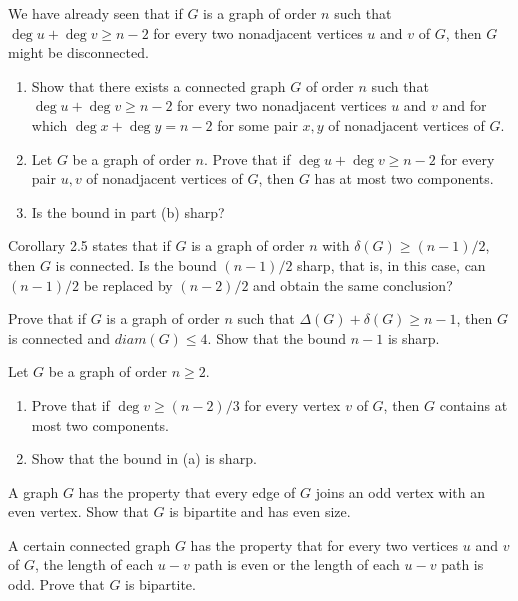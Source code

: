 \begin{exer}
We have already seen that if $G$ is a graph of order $n$ such that $\deg{}{u}+\deg{}{v} \geq n-2$ for every two nonadjacent vertices $u$ and $v$ of $G$, then $G$ might be disconnected.
\begin{enumerate}[{(a)}]
\item Show that there exists a connected graph $G$ of order $n$ such that $\deg{}{u}+\deg{}{v} \geq n-2$ for every two nonadjacent vertices $u$ and $v$ and for which $\deg{}{x}+\deg{}{y}=n-2$ for some pair $x,y$ of nonadjacent vertices of $G$.
\item Let $G$ be a graph of order $n$. Prove that if $\deg{}{u}+\deg{}{v} \geq n-2$ for every pair $u,v$ of nonadjacent vertices of $G$, then $G$ has at most two components.
\item Is the bound in part (b) sharp?
\end{enumerate}
\end{exer}

\begin{exer}
Corollary 2.5 states that if $G$ is a graph of order $n$ with $\delta(G) \geq (n-1)/2$, then $G$ is connected. Is the bound $(n-1)/2$ sharp, that is, in this case, can $(n-1)/2$ be replaced by $(n-2)/2$ and obtain the same conclusion?
\end{exer}

\begin{exer}
Prove that if $G$ is a graph of order $n$ such that $\Delta(G)+\delta(G) \geq n-1$, then $G$ is connected and $diam(G) \leq 4$. Show that the bound $n-1$ is sharp.
\end{exer}

\begin{exer}
Let $G$ be a graph of order $n \geq 2$.
\begin{enumerate}[{(a)}]
\item Prove that if $\deg{}{v} \geq (n-2)/3$ for every vertex $v$ of $G$, then $G$ contains at most two components.
\item Show that the bound in (a) is sharp.
\end{enumerate}
\end{exer}

\begin{exer}
A graph $G$ has the property that every edge of $G$ joins an odd vertex with an even vertex. Show that $G$ is bipartite and has even size.
\end{exer}

\begin{exer}
A certain connected graph $G$ has the property that for every two vertices $u$ and $v$ of $G$, the length of each $u-v$ path is even or the length of each $u-v$ path is odd. Prove that $G$ is bipartite.
\end{exer}

